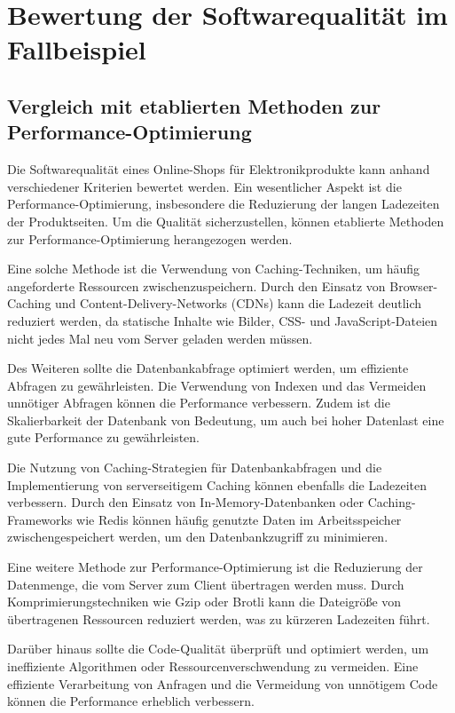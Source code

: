 \section{Bewertung der Softwarequalität im Fallbeispiel}
\subsection{Vergleich mit etablierten Methoden zur Performance-Optimierung}
Die Softwarequalität eines Online-Shops für Elektronikprodukte kann anhand verschiedener Kriterien bewertet werden. Ein wesentlicher Aspekt ist die Performance-Optimierung, insbesondere die Reduzierung der langen Ladezeiten der Produktseiten. Um die Qualität sicherzustellen, können etablierte Methoden zur Performance-Optimierung herangezogen werden.

Eine solche Methode ist die Verwendung von Caching-Techniken, um häufig angeforderte Ressourcen zwischenzuspeichern. Durch den Einsatz von Browser-Caching und Content-Delivery-Networks (CDNs) kann die Ladezeit deutlich reduziert werden, da statische Inhalte wie Bilder, CSS- und JavaScript-Dateien nicht jedes Mal neu vom Server geladen werden müssen.

Des Weiteren sollte die Datenbankabfrage optimiert werden, um effiziente Abfragen zu gewährleisten. Die Verwendung von Indexen und das Vermeiden unnötiger Abfragen können die Performance verbessern. Zudem ist die Skalierbarkeit der Datenbank von Bedeutung, um auch bei hoher Datenlast eine gute Performance zu gewährleisten.

Die Nutzung von Caching-Strategien für Datenbankabfragen und die Implementierung von serverseitigem Caching können ebenfalls die Ladezeiten verbessern. Durch den Einsatz von In-Memory-Datenbanken oder Caching-Frameworks wie Redis können häufig genutzte Daten im Arbeitsspeicher zwischengespeichert werden, um den Datenbankzugriff zu minimieren.

Eine weitere Methode zur Performance-Optimierung ist die Reduzierung der Datenmenge, die vom Server zum Client übertragen werden muss. Durch Komprimierungstechniken wie Gzip oder Brotli kann die Dateigröße von übertragenen Ressourcen reduziert werden, was zu kürzeren Ladezeiten führt.

Darüber hinaus sollte die Code-Qualität überprüft und optimiert werden, um ineffiziente Algorithmen oder Ressourcenverschwendung zu vermeiden. Eine effiziente Verarbeitung von Anfragen und die Vermeidung von unnötigem Code können die Performance erheblich verbessern.

